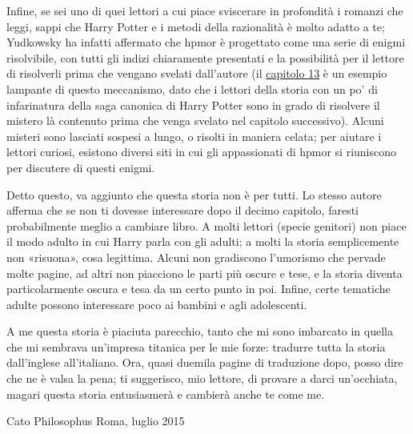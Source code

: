Infine, se sei uno di quei lettori a cui piace sviscerare in profondità i romanzi che leggi, sappi che Harry Potter e i metodi della razionalità è molto adatto a te; Yudkowsky ha infatti affermato che hpmor è progettato come una serie di enigmi risolvibile, con tutti gli indizi chiaramente presentati e la possibilità per il lettore di risolverli prima che vengano svelati dall’autore (il \hyperref[capitolo:13]{capitolo 13} è un esempio lampante di questo meccanismo, dato che i lettori della storia con un po’ di infarinatura della saga canonica di Harry Potter sono in grado di risolvere il mistero là contenuto prima che venga svelato nel capitolo successivo). Alcuni misteri sono lasciati sospesi a lungo, o risolti in maniera celata; per aiutare i lettori curiosi, esistono diversi siti in cui gli appassionati di hpmor si riuniscono per discutere di questi enigmi.

Detto questo, va aggiunto che questa storia non è per tutti. Lo stesso autore afferma che se non ti dovesse interessare dopo il decimo capitolo, faresti probabilmente meglio a cambiare libro. A molti lettori (specie genitori) non piace il modo adulto in cui Harry parla con gli adulti; a molti la storia semplicemente non «risuona», cosa legittima. Alcuni non gradiscono l’umorismo che pervade molte pagine, ad altri non piacciono le parti più oscure e tese, e la storia diventa particolarmente oscura e tesa da un certo punto in poi. Infine, certe tematiche adulte possono interessare poco ai bambini e agli adolescenti.

A me questa storia è piaciuta parecchio, tanto che mi sono imbarcato in quella che mi sembrava un’impresa titanica per le mie forze: tradurre tutta la storia dall’inglese all’italiano. Ora, quasi duemila pagine di traduzione dopo, posso dire che ne è valsa la pena; ti suggerisco, mio lettore, di provare a darci un’occhiata, magari questa storia entusiasmerà e cambierà anche te come me.

Cato Philosophus
Roma, luglio 2015